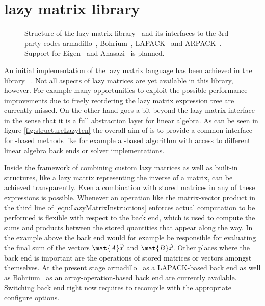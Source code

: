 \section{\lazyten lazy matrix library}
\begin{figure}
	\centering
	\caption[Structure of the \lazyten lazy matrix library]{%
		Structure of the \lazyten lazy matrix library~\cite{lazytenWeb}
		and its interfaces to the 3rd party codes
		armadillo~\cite{Armadillo}, Bohrium~\cite{Kristensen2016array,Kristensen2016streaming},
		LAPACK~\cite{LAPACK} and ARPACK~\cite{Lehoucq1998}.
		Support for Eigen~\cite{Eigen} and Anasazi~\cite{Anasazi} is planned.
	}
	\label{fig:structureLazyten}
\end{figure}
An initial implementation of the lazy matrix language has been
achieved in the \cpp library \lazyten~\cite{lazytenWeb}.
Not all aspects of lazy matrices are yet available in this library, however.
For example many opportunities to exploit the possible performance improvements
due to freely reordering the lazy matrix expression tree are currently missed.
On the other hand \lazyten goes a bit beyond the lazy matrix interface
in the sense that it is a full abstraction layer for linear algebra.
As can be seen in figure \vref{fig:structureLazyten}
the overall aim of \lazyten is to provide a common interface
for \contraction-based methods like for example a \contraction-based \SCF algorithm
with access to different linear algebra back ends or solver implementations.

Inside the framework of \lazyten combining custom lazy matrices
as well as built-in structures,
like a lazy matrix representing the inverse of a matrix,
can be achieved transparently.
Even a combination with stored matrices in any of these expressions is possible.
Whenever an operation like the matrix-vector product in the third line
of \eqref{eqn:LazyMatrixInstructions}
enforces actual computation to be performed
\lazyten is flexible with respect to the \LA back end,
which is used to compute the sums and products between the
stored quantities that appear along the way.
In the example above the \LA back end would for example be
responsible for evaluating the final sum of the vectors
$\mat{A} \tilde{\vec{x}}$ and $\mat{B} \tilde{\vec{x}}$.
Other places where the \LA back end is important
are the operations of stored matrices or vectors amongst themselves.
At the present stage armadillo~\cite{Armadillo}
as a LAPACK-based back end
as well as Bohrium~\cite{Kristensen2016array,Kristensen2016streaming}
as an array-operation-based back end are currently available.
Switching back end right now requires to recompile \lazyten
with the appropriate configure options.

